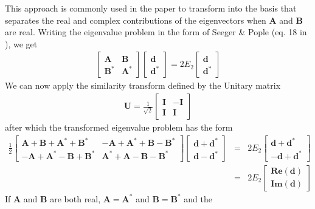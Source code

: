 \documentclass{revtex4}
\begin{document}
This approach is commonly used in the paper to transform into the basis that separates
the real and complex contributions of the eigenvectors when $\mathbf{A}$ and $\mathbf{B}$ are real.
Writing the eigenvalue problem in the form of Seeger \& Pople (eq. 18 in \cite{Seeger1977}), 
we get
\begin{eqnarray}
  \begin{bmatrix}
    \mathbf{A} & \mathbf{B} \\
    \mathbf{B^*} & \mathbf{A^*} 
  \end{bmatrix}
  \begin{bmatrix}
    \mathbf{d} \\
    \mathbf{d^*} 
  \end{bmatrix}
  = 2E_2
  \begin{bmatrix}
    \mathbf{d} \\
    \mathbf{d^*} 
  \end{bmatrix}
\end{eqnarray}
We can now apply the similarity transform defined by the Unitary matrix 
\begin{eqnarray}
  \mathbf{U} = \frac{1}{\sqrt{2}}
  \begin{bmatrix}
    \mathbf{I} & -\mathbf{I} \\
    \mathbf{I} & \mathbf{I} 
  \end{bmatrix}
\end{eqnarray}
after which the transformed eigenvalue problem has the form
\begin{eqnarray}
  \frac{1}{2}
  \begin{bmatrix}
    \mathbf{A + B + A^* + B^*} & \mathbf{-A + A^* + B - B^*} \\
    \mathbf{-A + A^* - B + B^*} & \mathbf{A^* + A - B - B^*} 
  \end{bmatrix}
  \begin{bmatrix}
    \mathbf{d + d^*} \\
    \mathbf{d - d^*} 
  \end{bmatrix}
  &=& 2E_2
  \begin{bmatrix}
    \mathbf{d + d^*} \\
    \mathbf{-d + d^*} 
  \end{bmatrix} \\
  &=& 2E_2
  \begin{bmatrix}
    \mathbf{Re(d)} \\
    \mathbf{Im(d)} 
  \end{bmatrix}
\end{eqnarray}
If $\mathbf{A}$ and $\mathbf{B}$ are both real, $\mathbf{A = A^*}$ and $\mathbf{B = B^*}$ and the 
\end{document}
